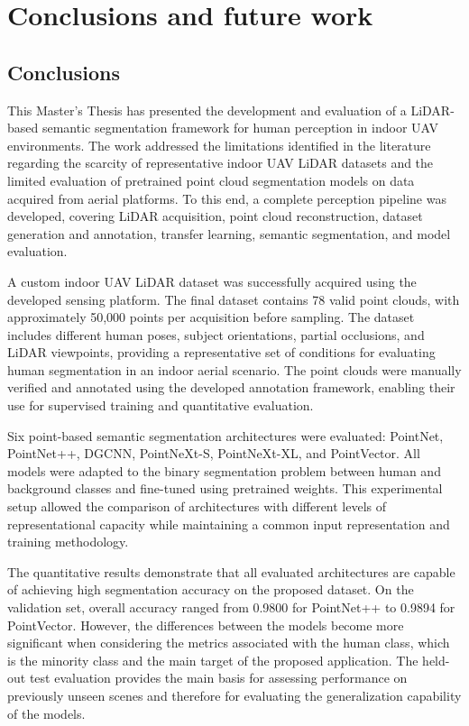 \chapter{Conclusions and future work}
\label{cha:conclusions}

\section{Conclusions}

This Master's Thesis has presented the development and evaluation of a LiDAR-based semantic segmentation framework for human perception in indoor UAV environments. The work addressed the limitations identified in the literature regarding the scarcity of representative indoor UAV LiDAR datasets and the limited evaluation of pretrained point cloud segmentation models on data acquired from aerial platforms. To this end, a complete perception pipeline was developed, covering LiDAR acquisition, point cloud reconstruction, dataset generation and annotation, transfer learning, semantic segmentation, and model evaluation.

A custom indoor UAV LiDAR dataset was successfully acquired using the developed sensing platform. The final dataset contains 78 valid point clouds, with approximately 50,000 points per acquisition before sampling. The dataset includes different human poses, subject orientations, partial occlusions, and LiDAR viewpoints, providing a representative set of conditions for evaluating human segmentation in an indoor aerial scenario. The point clouds were manually verified and annotated using the developed annotation framework, enabling their use for supervised training and quantitative evaluation.

Six point-based semantic segmentation architectures were evaluated: PointNet, PointNet++, DGCNN, PointNeXt-S, PointNeXt-XL, and PointVector. All models were adapted to the binary segmentation problem between human and background classes and fine-tuned using pretrained weights. This experimental setup allowed the comparison of architectures with different levels of representational capacity while maintaining a common input representation and training methodology.

The quantitative results demonstrate that all evaluated architectures are capable of achieving high segmentation accuracy on the proposed dataset. On the validation set, overall accuracy ranged from 0.9800 for PointNet++ to 0.9894 for PointVector. However, the differences between the models become more significant when considering the metrics associated with the human class, which is the minority class and the main target of the proposed application. The held-out test evaluation provides the main basis for assessing performance on previously unseen scenes and therefore for evaluating the generalization capability of the models.

